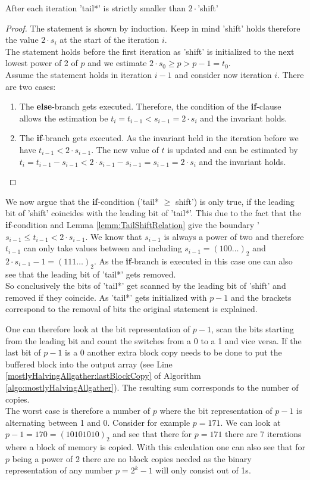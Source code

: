 \begin{lemma}
	After each iteration 'tail*' is strictly smaller than $2\cdot$'shift'
\end{lemma} \label{lemm:TailShiftRelation}
\begin{proof}
	The statement is shown by induction. Keep in mind 'shift' holds therefore the value $2\cdot s_i$ at the start of the iteration $i$.\\
	The statement holds before the first iteration as 'shift' is initialized to the next lowest power of 2 of $p$ and we estimate $2\cdot s_0 \geq p > p-1 = t_0$.\\
	Assume the statement holds in iteration $i-1$ and consider now iteration $i$. There are two cases:
	\begin{enumerate}
	\item The \textbf{else}-branch gets executed. Therefore, the condition of the \textbf{if}-clause allows the estimation be $t_i=t_{i-1} < s_{i-1} = 2\cdot s_i$ and the invariant holds.
	\item The \textbf{if}-branch gets executed. As the invariant held in the iteration before we have $t_{i-1} < 2 \cdot s_{i-1}$. The new value of $t$ is updated and can be estimated by $t_i = t_{i-1}-s_{i-1} < 2\cdot s_{i-1}-s_{i-1} = s_{i-1} = 2\cdot s_{i}$ and the invariant holds. 
	\end{enumerate}
\end{proof}
We now argue that the \textbf{if}-condition ('tail* $\geq$ shift') is only true, if the leading bit of 'shift' coincides with the leading bit of 'tail*'.  This due to the fact that the \textbf{if}-condition and Lemma \ref{lemm:TailShiftRelation}  give the boundary '$s_{i-1}\leq t_{i-1} < 2\cdot s_{i-1}$. We know that $s_{i-1}$ is always a power of two and therefore $t_{i-1}$ can only take values between and including $s_{i-1}=(100\dots)_2$ and $2\cdot s_{i-1}-1=(111\dots)_2$. As the \textbf{if}-branch is executed in this case one can also see that the leading bit of 'tail*' gets removed.\\
So conclusively the bits of 'tail*' get scanned by the leading bit of 'shift' and removed if they coincide. As 'tail*' gets initialized with $p-1$ and the brackets correspond to the removal of bits the original statement is explained.

One can therefore look at the bit representation of $p-1$, scan the bits starting from the leading bit and count the switches from a 0 to a 1 and vice versa. If the last bit of $p-1$ is a 0 another extra block copy needs to be done to put the buffered block into the output array (see Line \ref{mostlyHalvingAllgather:lastBlockCopy} of Algorithm \ref{algo:mostlyHalvingAllgather}). The resulting sum corresponds to the number of copies.\\
The worst case is therefore a number of $p$ where the bit representation of $p-1$ is alternating between 1 and 0. Consider for example $p=171$. We can look at $p-1=170=(10101010)_2$ and see that there for $p=171$ there are 7 iterations where a block of memory is copied. With this calculation one can also see that for $p$ being a power of 2 there are no block copies needed as the binary representation of any number $p=2^k-1$ will only consist out of 1s. 


